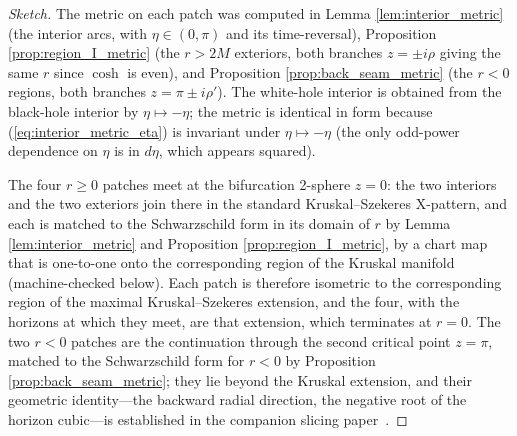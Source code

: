 \documentclass[11pt,a4paper]{article}
\theoremstyle{definition}
\begin{document}
\begin{proof}[Sketch]
The metric on each patch was computed in Lemma \ref{lem:interior_metric} (the interior arcs, with $\eta \in (0,\pi)$ and its time-reversal), Proposition \ref{prop:region_I_metric} (the $r>2M$ exteriors, both branches $z = \pm i\rho$ giving the same $r$ since $\cosh$ is even), and Proposition \ref{prop:back_seam_metric} (the $r<0$ regions, both branches $z = \pi \pm i\rho'$). The white-hole interior is obtained from the black-hole interior by $\eta \mapsto -\eta$; the metric is identical in form because (\ref{eq:interior_metric_eta}) is invariant under $\eta \mapsto -\eta$ (the only odd-power dependence on $\eta$ is in $d\eta$, which appears squared).

The four $r \geq 0$ patches meet at the bifurcation 2-sphere $z=0$: the two interiors and the two exteriors join there in the standard Kruskal--Szekeres X-pattern, and each is matched to the Schwarzschild form in its domain of $r$ by Lemma \ref{lem:interior_metric} and Proposition \ref{prop:region_I_metric}, by a chart map that is one-to-one onto the corresponding region of the Kruskal manifold (machine-checked below). Each patch is therefore isometric to the corresponding region of the maximal Kruskal--Szekeres extension, and the four, with the horizons at which they meet, are that extension, which terminates at $r=0$. The two $r<0$ patches are the continuation through the second critical point $z=\pi$, matched to the Schwarzschild form for $r<0$ by Proposition \ref{prop:back_seam_metric}; they lie beyond the Kruskal extension, and their geometric identity---the backward radial direction, the negative root of the horizon cubic---is established in the companion slicing paper~\cite{JanzenSlicing}.
\end{proof}
\end{document}
